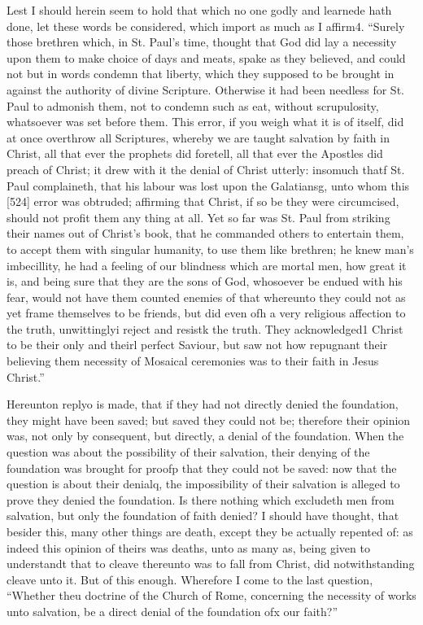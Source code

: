 Lest I should herein seem to hold that which no one godly and learnede hath done, let these words be considered, which import as much as I affirm4. “Surely those brethren which, in St. Paul’s time, thought that God did lay a necessity upon them to make choice of days and meats, spake as they believed, and could not but in words condemn that liberty, which they supposed to be brought in against the authority of divine Scripture. Otherwise it had been needless for St. Paul to admonish them, not to condemn such as eat, without scrupulosity, whatsoever was set before them. This error, if you weigh what it is of itself, did at once overthrow all Scriptures, whereby we are taught salvation by faith in Christ, all that ever the prophets did foretell, all that ever the Apostles did preach of Christ; it drew with it the denial of Christ utterly: insomuch thatf St. Paul complaineth, that his labour was lost upon the Galatiansg, unto whom this [524] error was obtruded; affirming that Christ, if so be they were circumcised, should not profit them any thing at all. Yet so far was St. Paul from striking their names out of Christ’s book, that he commanded others to entertain them, to accept them with singular humanity, to use them like brethren; he knew man’s imbecillity, he had a feeling of our blindness which are mortal men, how great it is, and being sure that they are the sons of God, whosoever be endued with his fear, would not have them counted enemies of that whereunto they could not as yet frame themselves to be friends, but did even ofh a very religious affection to the truth, unwittinglyi reject and resistk the truth. They acknowledged1 Christ to be their only and theirl perfect Saviour, but saw not how repugnant their believing them necessity of Mosaical ceremonies was to their faith in Jesus Christ.”

Hereunton replyo is made, that if they had not directly denied the foundation, they might have been saved; but saved they could not be; therefore their opinion was, not only by consequent, but directly, a denial of the foundation. When the question was about the possibility of their salvation, their denying of the foundation was brought for proofp that they could not be saved: now that the question is about their denialq, the impossibility of their salvation is alleged to prove they denied the foundation. Is there nothing which excludeth men from salvation, but only the foundation of faith denied? I should have thought, that besider this, many other things are death, except they be actually repented of: as indeed this opinion of theirs was deaths, unto as many as, being given to understandt that to cleave thereunto was to fall from Christ, did notwithstanding cleave unto it. But of this enough. Wherefore I come to the last question, “Whether theu doctrine of the Church of Rome, concerning the necessity of works unto salvation, be a direct denial of the foundation ofx our faith?”

